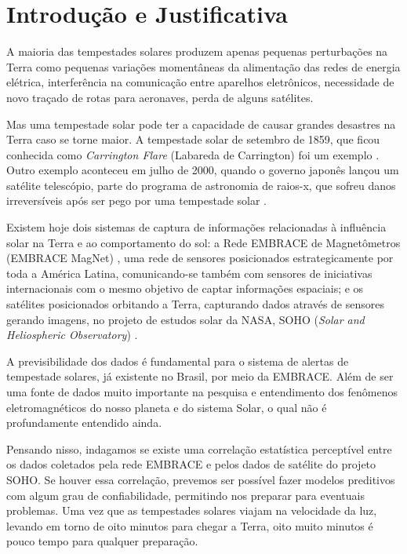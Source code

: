 \documentclass[12pt,2019]{uftpibic}
\theoremstyle{plain}
\begin{document}
\pagebreak
\setlength{\parindent}{1.5cm}
\chapter{Introdução e Justificativa}

A maioria das tempestades solares produzem apenas pequenas perturbações na Terra como pequenas variações momentâneas da alimentação das redes de energia elétrica, interferência na comunicação entre aparelhos eletrônicos, necessidade de novo traçado de rotas para aeronaves, perda de alguns satélites. 

Mas uma tempestade solar pode ter a capacidade de causar grandes desastres na Terra caso se torne maior. A tempestade solar de setembro de 1859, que ficou conhecida como \textit{Carrington Flare} (Labareda de Carrington) foi um exemplo \cite{Carrington2003}. Outro exemplo aconteceu em julho de 2000, quando o governo japonês lançou um satélite telescópio, parte do programa de astronomia de raios-x, que sofreu danos irreversíveis após ser pego por uma tempestade solar \cite{Dennis2000}.

Existem hoje dois sistemas de captura de informações relacionadas à influência solar na Terra e ao comportamento do sol: a Rede EMBRACE de Magnetômetros (EMBRACE MagNet) \cite{Denardini2015,Denardini2016,Denardini2018,Denardini2018b}, uma rede de sensores posicionados estrategicamente por toda a América Latina, comunicando-se também com sensores de iniciativas internacionais com o mesmo objetivo de captar informações espaciais; e os satélites posicionados orbitando a Terra, capturando dados através de sensores gerando imagens, no projeto de estudos solar da NASA, SOHO (\textit{Solar and Heliospheric Observatory}) \cite{Akmal2001}.

A previsibilidade dos dados é fundamental para o sistema de alertas de tempestade solares, já existente no Brasil, por meio da EMBRACE. Além de ser uma fonte de dados muito importante na pesquisa e entendimento dos fenômenos eletromagnéticos do nosso planeta e do sistema Solar, o qual não é profundamente entendido ainda.

Pensando nisso, indagamos se existe uma correlação estatística perceptível entre os dados coletados pela rede EMBRACE e pelos dados de satélite do projeto SOHO. Se houver essa correlação, prevemos ser possível fazer modelos preditivos com algum grau de confiabilidade, permitindo nos preparar para eventuais problemas. Uma vez que as tempestades solares viajam na velocidade da luz, levando em torno de oito minutos para chegar a Terra, oito muito minutos é pouco tempo para qualquer preparação.
\end{document}
